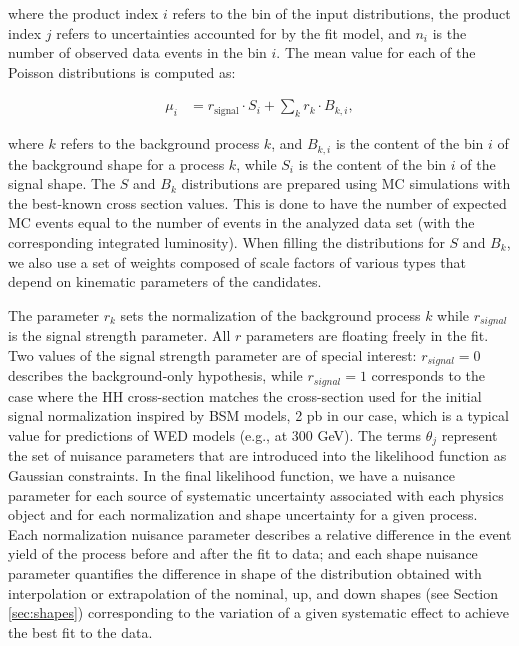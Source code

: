 \noindent where the product index $i$ refers to the bin of the input distributions, the product index $j$
refers to uncertainties accounted for by the fit model, and $n_i$ is the number of observed data
events in the bin $i$. The mean value for each of the Poisson distributions is computed as:

\begin{align*}
\mu_{i} &= r_{\text{signal}} \cdot S_{i} + \sum_{k}r_{k}\cdot B_{k,i},
\end{align*}

\noindent where $k$ refers to the background process $k$, and $B_{k,i}$ is the content of the bin $i$ of the background
shape for a process $k$, while $S_i$ is the content of the bin $i$ of the signal shape. The $S$ and $B_k$ distributions are prepared using MC simulations with the best-known cross section values. This is done to have the number of expected MC events equal to the number of events in the analyzed data set (with the corresponding integrated luminosity). When filling the distributions for $S$ and $B_k$, we also use a set of weights composed of scale factors of various types that depend on kinematic parameters of the candidates.

The parameter $r_k$ sets the normalization of the background process $k$ while $r_{signal}$ is the signal strength parameter. All $r$ parameters are floating freely in the fit. Two values of the signal strength parameter are of special interest: $r_{signal} = 0$ describes the background-only hypothesis, while $r_{signal} = 1$ corresponds to the case where the HH cross-section matches the cross-section used for the initial signal normalization inspired by BSM models, 2 pb in our case, which is a typical value for predictions of WED models (e.g., at 300 GeV). The terms $\theta_j$ represent the set of nuisance parameters that are introduced into the likelihood function as Gaussian constraints. In the final likelihood function, we have a nuisance parameter for each source of systematic uncertainty associated with each physics object and for each normalization and shape uncertainty for a given process. Each normalization nuisance parameter describes a relative difference in the event yield of the process before and after the fit to data; and each shape nuisance parameter quantifies the difference in shape of the \mTHH distribution obtained with interpolation or extrapolation of the nominal, up, and down shapes (see Section \ref{sec:shapes}) corresponding to the variation of a given systematic effect to achieve the best fit to the data.

